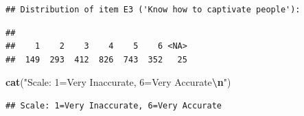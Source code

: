 \documentclass[
]{article}
\newenvironment{Shaded}{\begin{snugshade}}{\end{snugshade}}
\newcommand{\AttributeTok}[1]{\textcolor[rgb]{0.13,0.29,0.53}{#1}}
\newcommand{\FunctionTok}[1]{\textcolor[rgb]{0.13,0.29,0.53}{\textbf{#1}}}
\newcommand{\NormalTok}[1]{#1}
\newcommand{\SpecialCharTok}[1]{\textcolor[rgb]{0.81,0.36,0.00}{\textbf{#1}}}
\newcommand{\StringTok}[1]{\textcolor[rgb]{0.31,0.60,0.02}{#1}}
\begin{document}
\begin{verbatim}
## Distribution of item E3 ('Know how to captivate people'):
\end{verbatim}

\begin{Shaded}
\end{Shaded}

\begin{verbatim}
## 
##    1    2    3    4    5    6 <NA> 
##  149  293  412  826  743  352   25
\end{verbatim}

\begin{Shaded}
\begin{Highlighting}[]
\FunctionTok{cat}\NormalTok{(}\StringTok{"Scale: 1=Very Inaccurate, 6=Very Accurate}\SpecialCharTok{\textbackslash{}n}\StringTok{"}\NormalTok{)}
\end{Highlighting}
\end{Shaded}

\begin{verbatim}
## Scale: 1=Very Inaccurate, 6=Very Accurate
\end{verbatim}
\end{document}
